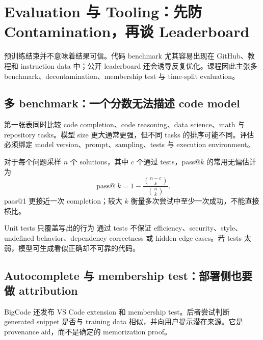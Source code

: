 \section{Evaluation 与 Tooling：先防 Contamination，再谈 Leaderboard}

预训练结束并不意味着结果可信。代码 benchmark 尤其容易出现在 GitHub、教程和 instruction data 中；公开 leaderboard 还会诱导反复优化。课程因此主张多 benchmark、decontamination、membership test 与 time-split evaluation。

\subsection{多 benchmark：一个分数无法描述 code model}

第一张表同时比较 code completion、code reasoning、data science、math 与 repository tasks。模型 size 更大通常更强，但不同 tasks 的排序可能不同。评估必须绑定 model version、prompt、sampling、tests 与 execution environment。



对于每个问题采样 $n$ 个 solutions，其中 $c$ 个通过 tests，pass@$k$ 的常用无偏估计为
\[
\operatorname{pass@}k=1-\frac{\binom{n-c}{k}}{\binom{n}{k}}.
\]
pass@1 更接近一次 completion；较大 $k$ 衡量多次尝试中至少一次成功，不能直接横比。

\begin{warningbox}{Unit tests 只覆盖写出的行为}
通过 tests 不保证 efficiency、security、style、undefined behavior、dependency correctness 或 hidden edge cases。若 tests 太弱，模型可生成看似正确却不可靠的代码。
\end{warningbox}


\subsection{Autocomplete 与 membership test：部署侧也要做 attribution}

BigCode 还发布 VS Code extension 和 membership test。后者尝试判断 generated snippet 是否与 training data 相似，并向用户提示潜在来源。它是 provenance aid，而不是确定的 memorization proof。

